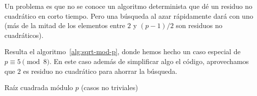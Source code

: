 \documentclass[english,spanish,fleqn]{article}
\begin{document}
  Un problema es que no se conoce un algoritmo determinista
  que dé un residuo no cuadrático
  en corto tiempo.
  Pero una búsqueda al azar rápidamente dará con uno
  (más de la mitad de los elementos entre \(2\) y \((p - 1) / 2\)
   son residuos no cuadráticos).

  Resulta el algoritmo~\ref{alg:sqrt-mod-p},
  donde hemos hecho un caso especial de \(p \equiv 5 \pmod{8}\).
  En este caso además de simplificar algo el código,
  aprovechamos que \(2\) es residuo no cuadrático
  para ahorrar la búsqueda.
  \begin{algorithm}
    \DontPrintSemicolon

    \caption{Raíz cuadrada módulo \(p\)
             (casos no triviales)}
    \label{alg:sqrt-mod-p}
  \end{algorithm}
\end{document}
